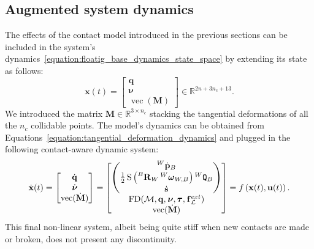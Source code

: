 \newpage
\subsection{Augmented system dynamics}

The effects of the contact model introduced in the previous sections can be included in the system's dynamics~\eqref{equation:floatig_base_dynamics_state_space} by extending its state as follows:
%
\begin{equation*}
    \mathbf{x}(t) =
    \begin{bmatrix}
        \mathbf{q} \\ \boldsymbol{\nu} \\ \operatorname{vec}(\mathbf{M})
    \end{bmatrix}
    \in \mathbb{R}^{2n+3n_c+13}
    .
\end{equation*}
%
We introduced the matrix $\mathbf{M} \in \mathbb{R}^{3 \times n_c}$ stacking the tangential deformations of all the $n_c$ collidable points.
The model's dynamics can be obtained from Equations~\eqref{equation:tangential_deformation_dynamics} and plugged in the following contact-aware dynamic system:
%
\begin{equation}
\label{equation:floatig_base_dynamics_with_contacts_state_space}
    \dot{\mathbf{x}}(t) =
    \begin{bmatrix}
        \Qud \\ \Nud \\ \operatorname{vec}(\dot{\mathbf{M}})
    \end{bmatrix} =
    \begin{bmatrix}
        \begin{pmatrix}
            \posd[W]_B \\
            \frac{1}{2} \operatorname{S}\left( \rot[B]_W \velang[W]_{W,B} \right) \quat[W]_B \\
            \dot{\mathbf{s}}
        \end{pmatrix} \\
        \operatorname{FD}(\mathcal{M}, \Qu, \Nu, \Torques, \forcesix_\mathcal{L}^{ext}) \\
        \operatorname{vec}(\dot{\mathbf{M}})
    \end{bmatrix} =
    f\left(\mathbf{x}(t), \mathbf{u}(t)\right)
    .
\end{equation}
%
This final non-linear system, albeit being quite stiff when new contacts are made or broken, does not present any discontinuity.

